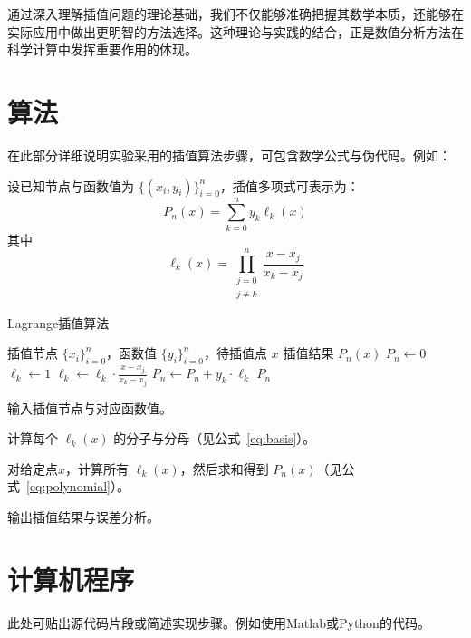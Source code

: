 \documentclass{joulabreport}
\begin{document}
通过深入理解插值问题的理论基础，我们不仅能够准确把握其数学本质，还能够在实际应用中做出更明智的方法选择。这种理论与实践的结合，正是数值分析方法在科学计算中发挥重要作用的体现。

\section{算法}
在此部分详细说明实验采用的插值算法步骤，可包含数学公式与伪代码。例如：

设已知节点与函数值为 $\{(x_i,y_i)\}_{i=0}^n$，插值多项式可表示为：
\begin{equation}
P_n(x) = \sum_{k=0}^{n} y_k \ell_k(x)
\label{eq:polynomial}
\end{equation}
其中
\begin{equation}
\ell_k(x) = \prod_{\substack{j=0\\j\neq k}}^n \frac{x - x_j}{x_k - x_j}
\label{eq:basis}
\end{equation}

\begin{algorithm}[htbp]
\caption{Lagrange插值算法}
\label{alg:lagrange}
\begin{algorithmic}[1]
\Require 插值节点 $\{x_i\}_{i=0}^n$，函数值 $\{y_i\}_{i=0}^n$，待插值点 $x$
\Ensure 插值结果 $P_n(x)$
\State $P_n \gets 0$
    \State $\ell_k \gets 1$
            \State $\ell_k \gets \ell_k \cdot \frac{x - x_j}{x_k - x_j}$
        \EndIf
    \EndFor
    \State $P_n \gets P_n + y_k \cdot \ell_k$
\EndFor
\State \Return $P_n$
\end{algorithmic}
\end{algorithm}

\begin{cnumerate}
\item 输入插值节点与对应函数值。
\item 计算每个 $\ell_k(x)$ 的分子与分母（见公式~\eqref{eq:basis}）。
\item 对给定点$x$，计算所有 $\ell_k(x)$，然后求和得到 $P_n(x)$（见公式~\eqref{eq:polynomial}）。
\item 输出插值结果与误差分析。
\end{cnumerate}

\section{计算机程序}
此处可贴出源代码片段或简述实现步骤。例如使用Matlab或Python的代码。
\end{document}
